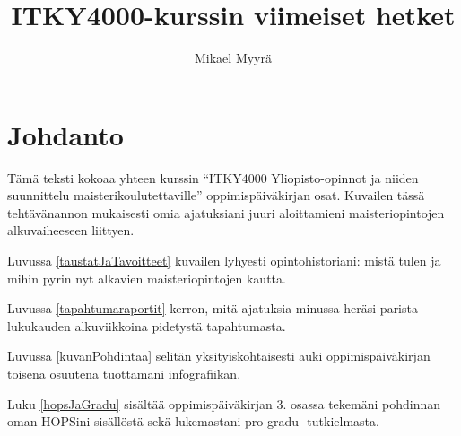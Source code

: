 \documentclass[utf8]{gradu3}
\begin{document}
\title{ITKY4000-kurssin viimeiset hetket}

\author{Mikael Myyrä}





\subject{IT-opiskelijoiden}

\maketitle

\mainmatter

\sloppypar

\chapter{Johdanto}

Tämä teksti kokoaa yhteen kurssin ``ITKY4000 Yliopisto-opinnot ja
niiden suunnittelu maisterikoulutettaville'' oppimispäiväkirjan
osat. Kuvailen tässä tehtävänannon mukaisesti omia ajatuksiani
juuri aloittamieni maisteriopintojen alkuvaiheeseen liittyen.

Luvussa \ref{taustatJaTavoitteet} kuvailen lyhyesti opintohistoriani:
mistä tulen ja mihin pyrin nyt alkavien maisteriopintojen kautta.

Luvussa \ref{tapahtumaraportit} kerron, mitä ajatuksia minussa
heräsi parista lukukauden alkuviikkoina pidetystä tapahtumasta.

Luvussa \ref{kuvanPohdintaa} selitän yksityiskohtaisesti auki
oppimispäiväkirjan toisena osuutena tuottamani infografiikan.

Luku \ref{hopsJaGradu} sisältää oppimispäiväkirjan 3. osassa tekemäni
pohdinnan oman HOPSini sisällöstä sekä lukemastani pro gradu
-tutkielmasta.
\end{document}
